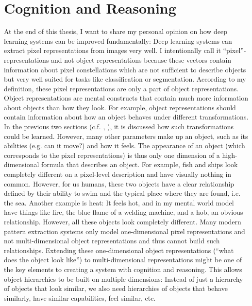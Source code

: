 \section{Cognition and Reasoning}
At the end of this thesis, I want to share my personal opinion on how deep learning systems can be improved fundamentally: Deep learning systems can extract pixel representations from images very well. I intentionally call it ``pixel''-representations and not object representations because these vectors contain information about pixel constellations which are not sufficient to describe objects but very well suited for tasks like classification or segmentation. According to my definition, these pixel representations are only a part of object representations. Object representations are mental constructs that contain much more information about objects than how they look. For example, object representations should contain information about how an object behaves under different transformations. In the previous two sections (c.f. , ), it is discussed how such transformations could be learned. However, many other parameters make up an object, such as its abilities (e.g. can it move?) and how it feels. The appearance of an object (which corresponds to the pixel representations) is thus only one dimension of a high-dimensional formula that describes an object. For example, fish and ships look completely different on a pixel-level description and have visually nothing in common. However, for us humans, these two objects have a clear relationship defined by their ability to swim and the typical place where they are found, i.e. the sea. Another example is heat: It feels hot, and in my mental world model have things like fire, the blue flame of a welding machine, and a hob, an obvious relationship. However, all these objects look completely different.
Many modern pattern extraction systems only model one-dimensional pixel representations and not multi-dimensional object representations and thus cannot build such relationships.
Extending these one-dimensional object representations (``what does the object look like'') to multi-dimensional representations might be one of the key elements to creating a system with cognition and reasoning. This allows object hierarchies to be built on multiple dimensions: Instead of just a hierarchy of objects that look similar, we also need hierarchies of objects that behave similarly, have similar capabilities, feel similar, etc.

